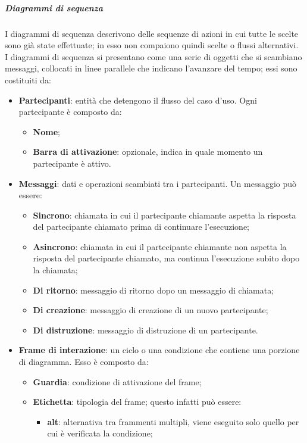 \documentclass[../norme-di-progetto.tex]{subfiles}
\begin{document}
\subparagraph*{Diagrammi di sequenza}
I diagrammi di sequenza descrivono delle sequenze di azioni in cui tutte le scelte sono già state effettuate; in esso non compaiono quindi scelte o flussi alternativi. \\
I diagrammi di sequenza si presentano come una serie di oggetti che si scambiano messaggi, collocati in linee parallele che indicano l'avanzare del tempo; essi sono costituiti da:
\begin{itemize}
  \item \textbf{Partecipanti}: entità che detengono il flusso del caso d'uso. Ogni partecipante è composto da:
  \begin{itemize}
    \item \textbf{Nome};
    \item \textbf{Barra di attivazione}: opzionale, indica in quale momento un partecipante è attivo.
  \end{itemize}
  \item \textbf{Messaggi}: dati e operazioni scambiati tra i partecipanti. Un messaggio può essere:
  \begin{itemize}
    \item \textbf{Sincrono}: chiamata in cui il partecipante chiamante aspetta la risposta del partecipante chiamato prima di continuare l'esecuzione;
    \item \textbf{Asincrono}: chiamata in cui il partecipante chiamante non aspetta la risposta del partecipante chiamato, ma continua l'esecuzione subito dopo la chiamata;
    \item \textbf{Di ritorno}: messaggio di ritorno dopo un messaggio di chiamata;
    \item \textbf{Di creazione}: messaggio di creazione di un nuovo partecipante;
    \item \textbf{Di distruzione}: messaggio di distruzione di un partecipante.
  \end{itemize}
  \item \textbf{Frame di interazione}: un ciclo o una condizione che contiene una porzione di diagramma. Esso è composto da:
  \begin{itemize}
    \item \textbf{Guardia}: condizione di attivazione del frame;
    \item \textbf{Etichetta}: tipologia del frame; questo infatti può essere:
    \begin{itemize}
      \item \textbf{alt}: alternativa tra frammenti multipli, viene eseguito solo quello per cui è verificata la condizione;

\end{itemize}
\end{itemize}
\end{itemize}
\end{document}
